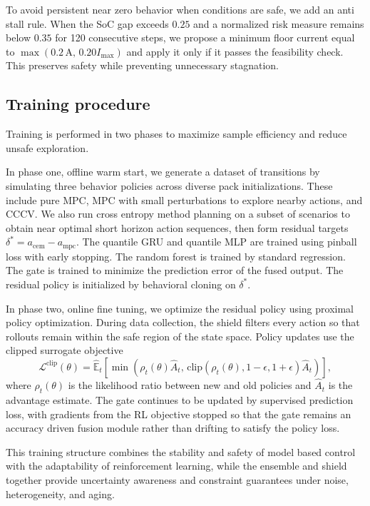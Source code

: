 \documentclass[%
 aip,
 amsmath,amssymb,
reprint, onecolumn %
]{revtex4-1}
\begin{document}
To avoid persistent near zero behavior when conditions are safe, we add an anti stall rule. When the SoC gap exceeds $0.25$ and a normalized risk measure remains below $0.35$ for 120 consecutive steps, we propose a minimum floor current equal to $\max(0.2\,\mathrm{A},\,0.20 I_{\max})$ and apply it only if it passes the feasibility check. This preserves safety while preventing unnecessary stagnation.

\subsection{Training procedure}
Training is performed in two phases to maximize sample efficiency and reduce unsafe exploration.

In phase one, offline warm start, we generate a dataset of transitions by simulating three behavior policies across diverse pack initializations. These include pure MPC, MPC with small perturbations to explore nearby actions, and CCCV. We also run cross entropy method planning on a subset of scenarios to obtain near optimal short horizon action sequences, then form residual targets $\delta^\ast = a_{\mathrm{cem}} - a_{\mathrm{mpc}}$. The quantile GRU and quantile MLP are trained using pinball loss with early stopping. The random forest is trained by standard regression. The gate is trained to minimize the prediction error of the fused output. The residual policy is initialized by behavioral cloning on $\delta^\ast$.

In phase two, online fine tuning, we optimize the residual policy using proximal policy optimization. During data collection, the shield filters every action so that rollouts remain within the safe region of the state space. Policy updates use the clipped surrogate objective
\begin{equation}
\mathcal{L}^{\mathrm{clip}}(\theta) =
\hat{\mathbb{E}}_t\left[
\min\!\left(
\rho_t(\theta)\hat A_t,\,
\mathrm{clip}(\rho_t(\theta),1-\epsilon,1+\epsilon)\hat A_t
\right)
\right],
\end{equation}
where $\rho_t(\theta)$ is the likelihood ratio between new and old policies and $\hat A_t$ is the advantage estimate. The gate continues to be updated by supervised prediction loss, with gradients from the RL objective stopped so that the gate remains an accuracy driven fusion module rather than drifting to satisfy the policy loss.

This training structure combines the stability and safety of model based control with the adaptability of reinforcement learning, while the ensemble and shield together provide uncertainty awareness and constraint guarantees under noise, heterogeneity, and aging.
\end{document}
